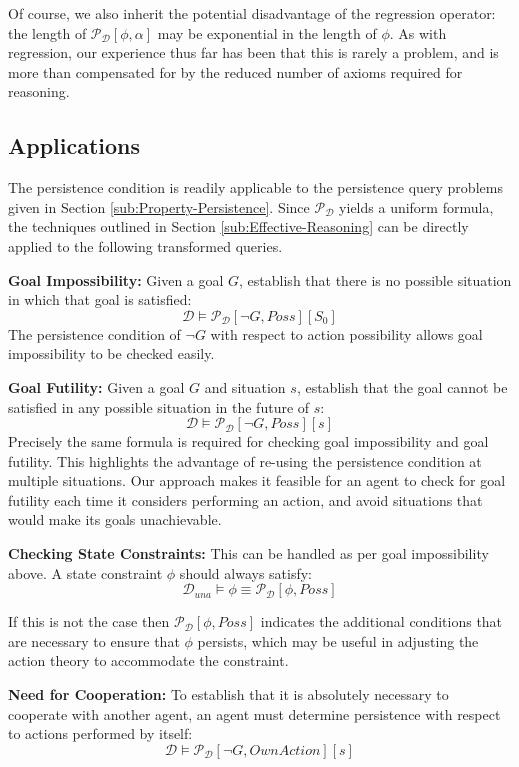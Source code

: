 Of course, we also inherit the potential disadvantage of the regression
operator: the length of $\mathcal{P_{D}}[\phi,\alpha]$ may be exponential
in the length of $\phi$. As with regression, our experience thus
far has been that this is rarely a problem, and is more than compensated
for by the reduced number of axioms required for reasoning.


\subsection{Applications}

The persistence condition is readily applicable to the persistence
query problems given in Section \ref{sub:Property-Persistence}. Since
$\mathcal{P}_{\mathcal{D}}$ yields a uniform formula, the techniques
outlined in Section \ref{sub:Effective-Reasoning} can be directly
applied to the following transformed queries.

\textbf{Goal Impossibility:} Given a goal $G$, establish that there
is no possible situation in which that goal is satisfied:\[
\mathcal{D}\models\mathcal{P_{D}}[\neg G,Poss][S_{0}]\]
The persistence condition of $\neg G$ with respect to action possibility
allows goal impossibility to be checked easily.

\textbf{Goal Futility:} Given a goal $G$ and situation $s$, establish
that the goal cannot be satisfied in any possible situation in the
future of $s$:\[
\mathcal{D}\models\mathcal{P_{D}}[\neg G,Poss][s]\]
Precisely the same formula is required for checking goal impossibility
and goal futility. This highlights the advantage of re-using the persistence
condition at multiple situations. Our approach makes it feasible for
an agent to check for goal futility each time it considers performing
an action, and avoid situations that would make its goals unachievable. 

\textbf{Checking State Constraints:} This can be handled as per goal
impossibility above. A state constraint $\phi$ should always satisfy:\[
\mathcal{D}_{una}\models\phi\equiv\mathcal{P}_{\mathcal{D}}[\phi,Poss]\]


If this is not the case then $\mathcal{P}_{\mathcal{D}}[\phi,Poss]$
indicates the additional conditions that are necessary to ensure that
$\phi$ persists, which may be useful in adjusting the action theory
to accommodate the constraint.

\textbf{Need for Cooperation:} To establish that it is absolutely
necessary to cooperate with another agent, an agent must determine
persistence with respect to actions performed by itself:\[
\mathcal{D}\models\mathcal{P_{D}}[\neg G,OwnAction][s]\]


